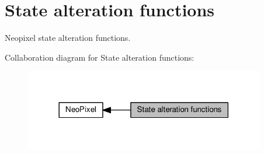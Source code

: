\hypertarget{group___neo_pixel___state}{}\section{State alteration functions}
\label{group___neo_pixel___state}


Neopixel state alteration functions.  


Collaboration diagram for State alteration functions\+:\nopagebreak
\begin{figure}[H]
\begin{center}
\leavevmode
\includegraphics[width=297pt]{da/d69/group___neo_pixel___state}
\end{center}
\end{figure}
